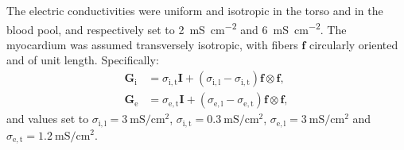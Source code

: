 \documentclass[runningheads]{llncs}
\newcommand{\tG}{\mathbf{G}}
\newcommand{\tGi}{\tG_\mathrm{i}}
\newcommand{\tGe}{\tG_\mathrm{e}}
\newcommand{\sil}{\sigma_{\mathrm{i},\mathrm{l}}}
\newcommand{\sit}{\sigma_{\mathrm{i},\mathrm{t}}}
\newcommand{\sel}{\sigma_{\mathrm{e},\mathrm{l}}}
\newcommand{\set}{\sigma_{\mathrm{e},\mathrm{t}}}
\begin{document}
The electric conductivities were uniform and isotropic in the torso and
in the blood pool, and respectively set to \SI{2}{\milli\siemens\per\square\cm}
and \SI{6}{\milli\siemens\per\square\cm}.  The myocardium was assumed
transversely isotropic, with fibers $\mathbf{f}$ circularly oriented
and of unit length. Specifically:
\begin{align*}
\tGi &= \sit\mathbf{I} + (\sil-\sit)\mathbf{f}\otimes\mathbf{f}, \\
\tGe &= \set\mathbf{I} + (\sel-\set)\mathbf{f}\otimes\mathbf{f},
\end{align*}
and values set to
$\sil = \SI{3}{\milli\siemens\per\square\cm}$,
$\sit = \SI{0.3}{\milli\siemens\per\square\cm}$,
$\sel = \SI{3}{\milli\siemens\per\square\cm}$ and
$\set = \SI{1.2}{\milli\siemens\per\square\cm}$.

\begin{figure}[tb]
    \centering
\end{figure}
\end{document}

